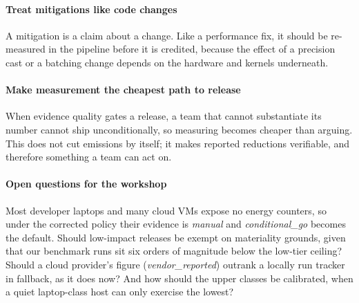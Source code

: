 \documentclass[10pt,conference]{IEEEtran}
\begin{document}
\paragraph{Treat mitigations like code changes} A mitigation is a claim about a
change. Like a performance fix, it should be re-measured in the pipeline before
it is credited, because the effect of a precision cast or a batching change
depends on the hardware and kernels underneath.

\paragraph{Make measurement the cheapest path to release} When evidence
quality gates a release, a team that cannot substantiate its number cannot ship
unconditionally, so measuring becomes cheaper than arguing. This does not cut
emissions by itself; it makes reported reductions verifiable, and therefore
something a team can act on.

\paragraph{Open questions for the workshop} Most developer laptops and many
cloud VMs expose no energy counters, so under the corrected policy their
evidence is \emph{manual} and \emph{conditional\_go} becomes the default. Should
low-impact releases be exempt on materiality grounds, given that our benchmark
runs sit six orders of magnitude below the low-tier ceiling? Should a cloud
provider's figure (\emph{vendor\_reported}) outrank a locally run tracker in
fallback, as it does now? And how should the upper classes be calibrated, when a
quiet laptop-class host can only exercise the lowest?
\end{document}
